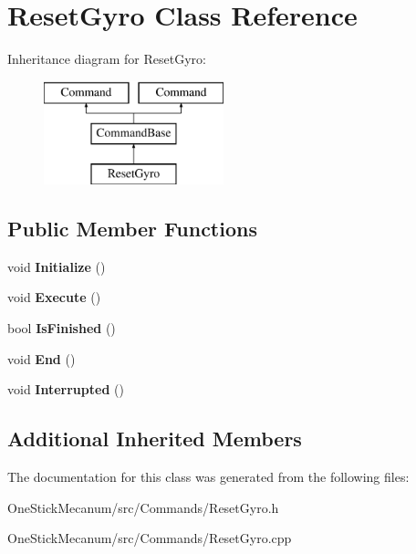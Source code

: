 \hypertarget{class_reset_gyro}{}\section{Reset\+Gyro Class Reference}
\label{class_reset_gyro}
Inheritance diagram for Reset\+Gyro\+:\begin{figure}[H]
\begin{center}
\leavevmode
\includegraphics[height=3.000000cm]{class_reset_gyro}
\end{center}
\end{figure}
\subsection*{Public Member Functions}
\begin{DoxyCompactItemize}
\item 
\hypertarget{class_reset_gyro_a7059bae68563ef67f9cb951c3aca06fd}{}void {\bfseries Initialize} ()\label{class_reset_gyro_a7059bae68563ef67f9cb951c3aca06fd}

\item 
\hypertarget{class_reset_gyro_a209770e2f9d9bc613337db5299025612}{}void {\bfseries Execute} ()\label{class_reset_gyro_a209770e2f9d9bc613337db5299025612}

\item 
\hypertarget{class_reset_gyro_a6e97a323fcbd92e1ad9d13ef37f84de8}{}bool {\bfseries Is\+Finished} ()\label{class_reset_gyro_a6e97a323fcbd92e1ad9d13ef37f84de8}

\item 
\hypertarget{class_reset_gyro_a0ab07b754a57ddba0e7e4f5c76720bda}{}void {\bfseries End} ()\label{class_reset_gyro_a0ab07b754a57ddba0e7e4f5c76720bda}

\item 
\hypertarget{class_reset_gyro_ae78ccc360a0a55103bc3a05b915da010}{}void {\bfseries Interrupted} ()\label{class_reset_gyro_ae78ccc360a0a55103bc3a05b915da010}

\end{DoxyCompactItemize}
\subsection*{Additional Inherited Members}


The documentation for this class was generated from the following files\+:\begin{DoxyCompactItemize}
\item 
One\+Stick\+Mecanum/src/\+Commands/Reset\+Gyro.\+h\item 
One\+Stick\+Mecanum/src/\+Commands/Reset\+Gyro.\+cpp\end{DoxyCompactItemize}
